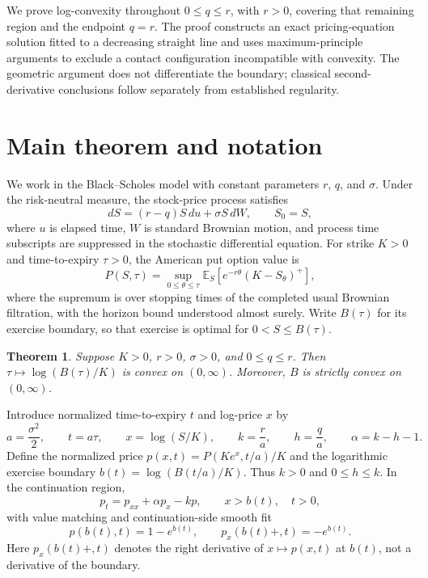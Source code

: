 \documentclass[11pt]{article}
\newtheorem{theorem}{Theorem}
\newcommand{\E}{\mathbb{E}}
\begin{document}
We prove log-convexity throughout $0\le q\le r$, with $r>0$, covering
that remaining region and the endpoint $q=r$. The proof constructs an
exact pricing-equation solution fitted to a decreasing straight line
and uses maximum-principle arguments to exclude a contact configuration
incompatible with convexity. The geometric argument does not differentiate
the boundary; classical second-derivative conclusions follow separately
from established regularity.

\section{Main theorem and notation}

We work in the Black--Scholes model with constant parameters $r$, $q$,
and $\sigma$. Under the risk-neutral measure, the stock-price process satisfies
\[
  dS=(r-q)S\,du+\sigma S\,dW,\qquad S_0=S,
\]
where $u$ is elapsed time, $W$ is standard Brownian motion, and process
time subscripts are suppressed in the stochastic differential equation.
For strike $K>0$ and time-to-expiry $\tau>0$, the American put
option value is
\[
  P(S,\tau)=\sup_{0\le\theta\le\tau}
    \E_S\!\left[e^{-r\theta}(K-S_\theta)^+\right],
\]
where the supremum is over stopping times of the completed usual
Brownian filtration, with the horizon bound understood almost surely.
Write $B(\tau)$ for its exercise boundary, so that exercise is optimal
for $0<S\le B(\tau)$.

\begin{theorem}\label{thm:main}
Suppose $K>0$, $r>0$, $\sigma>0$, and $0\le q\le r$. Then
$\tau\mapsto\log(B(\tau)/K)$ is convex on $(0,\infty)$.
Moreover, $B$ is strictly convex on $(0,\infty)$.
\end{theorem}

Introduce normalized time-to-expiry $t$ and log-price $x$ by
\[
  a=\frac{\sigma^2}{2},\qquad t=a\tau,\qquad
  x=\log(S/K),\qquad k=\frac r a,\qquad h=\frac q a,\qquad
  \alpha=k-h-1.
\]
Define the normalized price $p(x,t)=P(Ke^x,t/a)/K$ and the
logarithmic exercise boundary $b(t)=\log(B(t/a)/K)$.
Thus $k>0$ and $0\le h\le k$. In the continuation region,
\begin{equation}\label{eq:pricing}
  p_t=p_{xx}+\alpha p_x-kp,\qquad x>b(t),\quad t>0,
\end{equation}
with value matching and continuation-side smooth fit
\begin{equation}\label{eq:fit}
  p(b(t),t)=1-e^{b(t)},\qquad p_x(b(t)+,t)=-e^{b(t)}.
\end{equation}
Here $p_x(b(t)+,t)$ denotes the right derivative of $x\mapsto p(x,t)$
at $b(t)$, not a derivative of the boundary.
\end{document}
